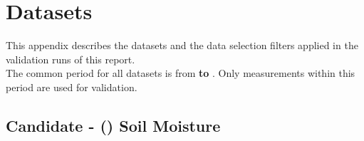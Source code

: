 \section{Datasets} \label{sec:datasets}

This appendix describes the datasets and the data selection filters applied in the validation runs of this report.
\\[1em]
\noindent The common period for all datasets is from \textbf{ to }.
Only measurements within this period are used for validation.

\subsection{Candidate -  () Soil Moisture}

